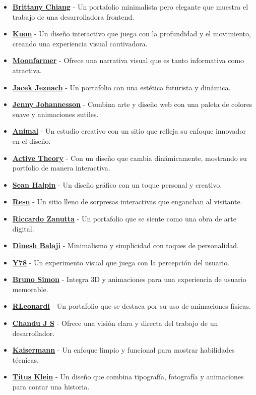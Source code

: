 \documentclass[
  jou,
  floatsintext,
  longtable,
  a4paper,
  nolmodern,
  notxfonts,
  notimes,
  12pt,
  colorlinks=true,linkcolor=blue,citecolor=blue,urlcolor=blue]{apa7}
\providecommand{\tightlist}{%
  \setlength{\itemsep}{0pt}\setlength{\parskip}{0pt}}
\begin{document}
\begin{itemize}
\tightlist
\item
  \href{https://brittanychiang.com/}{\textbf{Brittany Chiang}} - Un
  portafolio minimalista pero elegante que muestra el trabajo de una
  desarrolladora frontend.
\item
  \href{https://kuon.space/}{\textbf{Kuon}} - Un diseño interactivo que
  juega con la profundidad y el movimiento, creando una experiencia
  visual cautivadora.
\item
  \href{https://moonfarmer.com/}{\textbf{Moonfarmer}} - Ofrece una
  narrativa visual que es tanto informativa como atractiva.
\item
  \href{https://jacekjeznach.com/}{\textbf{Jacek Jeznach}} - Un
  portafolio con una estética futurista y dinámica.
\item
  \href{http://www.jennyjohannesson.com/}{\textbf{Jenny Johannesson}} -
  Combina arte y diseño web con una paleta de colores suave y
  animaciones sutiles.
\item
  \href{https://animalmade.com/}{\textbf{Animal}} - Un estudio creativo
  con un sitio que refleja su enfoque innovador en el diseño.
\item
  \href{https://activetheory.net/home}{\textbf{Active Theory}} - Con un
  diseño que cambia dinámicamente, mostrando su portfolio de manera
  interactiva.
\item
  \href{https://www.seanhalpin.design/}{\textbf{Sean Halpin}} - Un
  diseño gráfico con un toque personal y creativo.
\item
  \href{https://resn.co.nz/\#!/about}{\textbf{Resn}} - Un sitio lleno de
  sorpresas interactivas que enganchan al visitante.
\item
  \href{http://riccardozanutta.com/}{\textbf{Riccardo Zanutta}} - Un
  portafolio que se siente como una obra de arte digital.
\item
  \href{https://dineshbalaji.in/}{\textbf{Dinesh Balaji}} - Minimalismo
  y simplicidad con toques de personalidad.
\item
  \href{http://y78.fr/2/}{\textbf{Y78}} - Un experimento visual que
  juega con la percepción del usuario.
\item
  \href{https://bruno-simon.com/}{\textbf{Bruno Simon}} - Integra 3D y
  animaciones para una experiencia de usuario memorable.
\item
  \href{http://www.rleonardi.com/}{\textbf{RLeonardi}} - Un portafolio
  que se destaca por su uso de animaciones físicas.
\item
  \href{https://chandujs.dev/}{\textbf{Chandu J S}} - Ofrece una visión
  clara y directa del trabajo de un desarrollador.
\item
  \href{https://kaisermann.me/}{\textbf{Kaisermann}} - Un enfoque limpio
  y funcional para mostrar habilidades técnicas.
\item
  \href{https://titusklein.com/}{\textbf{Titus Klein}} - Un diseño que
  combina tipografía, fotografía y animaciones para contar una historia.
\end{itemize}
\end{document}
